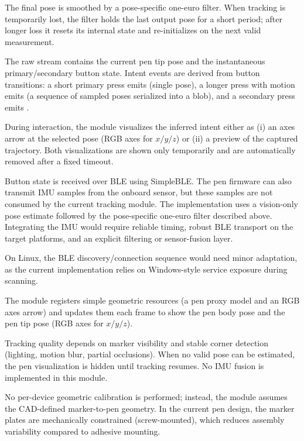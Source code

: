 The final pose is smoothed by a pose-specific one-euro filter. When tracking is temporarily lost, the filter holds the last output pose for a short period; after longer loss it resets its internal state and re-initializes on the next valid measurement.

The raw stream contains the current pen tip pose and the instantaneous primary/secondary button state.
Intent events are derived from button transitions:
a short primary press emits  (single pose),
a longer press with motion emits  (a sequence of sampled poses serialized into a blob),
and a secondary press emits .

During interaction, the module visualizes the inferred intent either as
(i) an axes arrow at the selected pose (RGB axes for $x/y/z$) or
(ii) a preview of the captured trajectory.
Both visualizations are shown only temporarily and are automatically removed after a fixed timeout.

Button state is received over BLE using SimpleBLE.
The pen firmware can also transmit IMU samples from the onboard sensor, but these samples are not consumed by the current tracking module.
The implementation uses a vision-only pose estimate followed by the pose-specific one-euro filter described above.
Integrating the IMU would require reliable timing, robust BLE transport on the target platforms, and an explicit filtering or sensor-fusion layer.

On Linux, the BLE discovery/connection sequence would need minor adaptation, as the current implementation relies on Windows-style service exposure during scanning.

The module registers simple geometric resources (a pen proxy model and an RGB axes arrow) and updates them each frame to show the pen body pose and the pen tip pose (RGB axes for $x/y/z$).

Tracking quality depends on marker visibility and stable corner detection (lighting, motion blur, partial occlusions).
When no valid pose can be estimated, the pen visualization is hidden until tracking resumes.
No IMU fusion is implemented in this module.

No per-device geometric calibration is performed; instead, the module assumes the CAD-defined marker-to-pen geometry. In the current pen design, the marker plates are mechanically constrained (screw-mounted), which reduces assembly variability compared to adhesive mounting.

